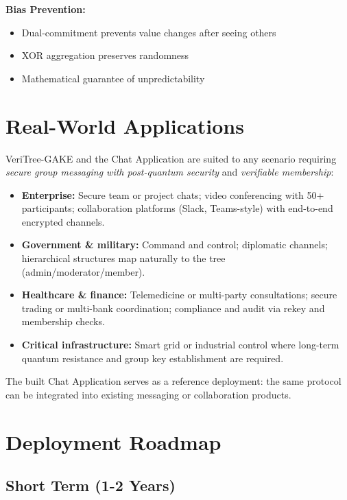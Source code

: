 \documentclass[12pt,a4paper]{report}
\begin{document}
\textbf{Bias Prevention:}
\begin{itemize}
\item Dual-commitment prevents value changes after seeing others
\item XOR aggregation preserves randomness
\item Mathematical guarantee of unpredictability
\end{itemize}

\section{Real-World Applications}

VeriTree-GAKE and the Chat Application are suited to any scenario requiring \emph{secure group messaging with post-quantum security} and \emph{verifiable membership}:

\begin{itemize}
\item \textbf{Enterprise:} Secure team or project chats; video conferencing with 50+ participants; collaboration platforms (Slack, Teams-style) with end-to-end encrypted channels.
\item \textbf{Government \& military:} Command and control; diplomatic channels; hierarchical structures map naturally to the tree (admin/moderator/member).
\item \textbf{Healthcare \& finance:} Telemedicine or multi-party consultations; secure trading or multi-bank coordination; compliance and audit via rekey and membership checks.
\item \textbf{Critical infrastructure:} Smart grid or industrial control where long-term quantum resistance and group key establishment are required.
\end{itemize}

The built Chat Application serves as a reference deployment: the same protocol can be integrated into existing messaging or collaboration products.

\section{Deployment Roadmap}

\subsection{Short Term (1-2 Years)}
\end{document}
